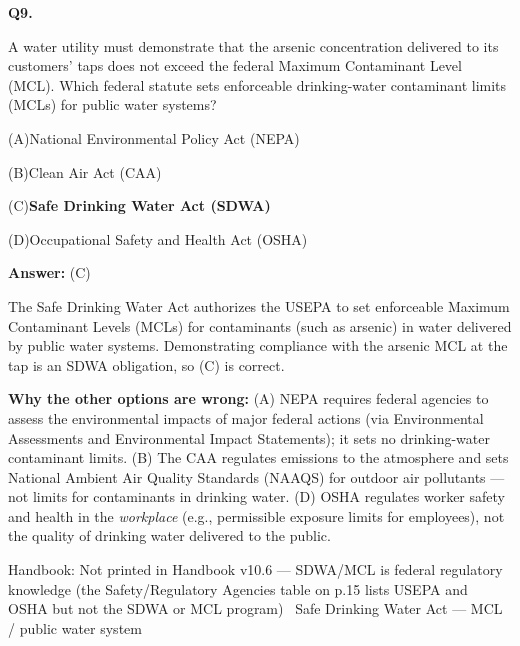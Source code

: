 \documentclass[11pt]{article}
\newcommand{\correct}[1]{\textbf{#1}\;{\color{accent}$\checkmark$}}
\newcommand{\optline}[2]{\par\noindent\hspace{1.2em}(#1)\hspace{0.6em}#2}
\begin{document}
\filbreak
\textbf{\color{accent}Q9.}\par\vspace{2pt}
A water utility must demonstrate that the arsenic concentration delivered to its customers' taps does not exceed the federal Maximum Contaminant Level (MCL). Which federal statute sets enforceable drinking-water contaminant limits (MCLs) for public water systems?\par\par\vspace{3pt}
\optline{A}{National Environmental Policy Act (NEPA)}
\optline{B}{Clean Air Act (CAA)}
\optline{C}{\correct{Safe Drinking Water Act (SDWA)}}
\optline{D}{Occupational Safety and Health Act (OSHA)}
\par\vspace{3pt}
\vspace{2pt}\par\noindent\colorbox{boxbg}{\parbox{\dimexpr\linewidth-2\fboxsep\relax}{%
\vspace{2pt}\textbf{Answer:} (C)\par\vspace{2pt}
{\small The Safe Drinking Water Act authorizes the USEPA to set enforceable Maximum Contaminant Levels (MCLs) for contaminants (such as arsenic) in water delivered by public water systems. Demonstrating compliance with the arsenic MCL at the tap is an SDWA obligation, so (C) is correct.\par
\textbf{Why the other options are wrong:} (A) NEPA requires federal agencies to assess the environmental impacts of major federal actions (via Environmental Assessments and Environmental Impact Statements); it sets no drinking-water contaminant limits. (B) The CAA regulates emissions to the atmosphere and sets National Ambient Air Quality Standards (NAAQS) for outdoor air pollutants --- not limits for contaminants in drinking water. (D) OSHA regulates worker safety and health in the \emph{workplace} (e.g., permissible exposure limits for employees), not the quality of drinking water delivered to the public.\par}\par\vspace{2pt}
{\footnotesize\color{soft}Handbook: Not printed in Handbook v10.6 --- SDWA/MCL is federal regulatory knowledge (the Safety/Regulatory Agencies table on p.15 lists USEPA and OSHA but not the SDWA or MCL program) \textbullet\ Safe Drinking Water Act --- MCL / public water system}\vspace{2pt}
}}
\end{document}

